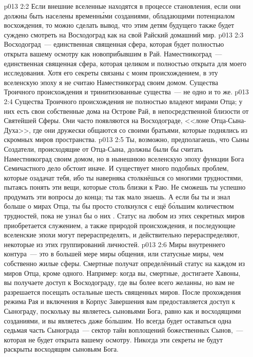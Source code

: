 \vs p013 2:2 Если внешние вселенные находятся в процессе становления, если они должны быть населены временн\'ыми созданиями, обладающими потенциалом восхождения, то можно сделать вывод, что этим детям будущего также будет суждено смотреть на Восходоград как на свой Райский домашний мир.
\vs p013 2:3 \pc Восходоград~--- единственная священная сфера, которая будет полностью открыта вашему осмотру как новоприбывшим в Рай. Наместникоград~--- единственная священная сфера, которая целиком и полностью открыта для моего исследования. Хотя его секреты связаны с моим происхождением, в эту вселенскую эпоху я не считаю Наместникоград своим домом. Существа Троичного происхождения и тринитизованные существа~--- не одно и то же.
\vs p013 2:4 \pc Существа Троичного происхождения не полностью владеют мирами Отца; у них есть свои собственные дома на Острове Рай, в непосредственной близости от Святейшей Сферы. Они часто появляются на Восходограде, <<лоне Отца\hyp{}Сына\hyp{}Духа>>, где они дружески общаются со своими братьями, которые поднялись из скромных миров пространства.
\vs p013 2:5 \pc Ты, возможно, предполагаешь, что Сыны Создатели, происходящие от Отца\hyp{}Сына, должны были бы считать Наместникоград своим домом, но в нынешнюю вселенскую эпоху функции Бога Семичастного дело обстоит иначе. И существует много подобных проблем, которые озадачат тебя, ибо ты наверняка столкнёшься со многими трудностями, пытаясь понять эти вещи, которые столь близки к Раю. Не сможешь ты успешно продумать эти вопросы до конца; ты так мало знаешь. А если бы ты и знал больше о мирах Отца, ты бы просто столкнулся с ещё б\'ольшим количеством трудностей, пока не узнал бы о них . Статус на любом из этих секретных миров приобретается служением, а также природой происхождения, и последующие вселенские эпохи могут перераспределять, и действительно перераспределяют, некоторые из этих группирований личностей.
\vs p013 2:6 \pc Миры внутреннего контура~--- это в большей мере миры общения, или статусные миры, чем собственно жилые сферы. Смертные получат определённый статус на каждом из миров Отца, кроме одного. Например: когда вы, смертные, достигаете Хавоны, вы получаете доступ к Восходограду, где вы более всего желанны, но вам не разрешается посещать остальные шесть священных миров. После прохождения режима Рая и включения в Корпус Завершения вам предоставляется доступ к Сынограду, поскольку вы являетесь сыновьями Бога, равно как и восходящими созданиями, и вы являетесь даже б\'ольшим. Но всегда будет оставаться одна седьмая часть Сынограда~--- сектор тайн воплощений божественных Сынов,~--- которая не будет открыта вашему осмотру. Никогда эти секреты не будут раскрыты восходящим сыновьям Бога.
